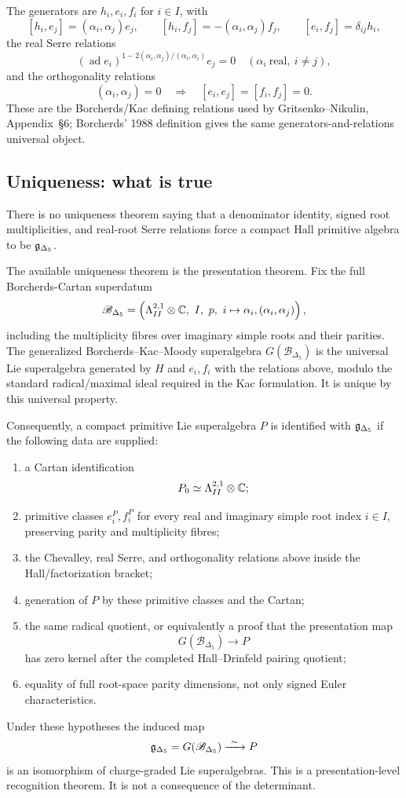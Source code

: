 The generators are \(h_i,e_i,f_i\) for \(i\in I\), with
\[
[h_i,e_j]=(\alpha_i,\alpha_j)e_j,\qquad
[h_i,f_j]=-(\alpha_i,\alpha_j)f_j,\qquad
[e_i,f_j]=\delta_{ij}h_i,
\]
the real Serre relations
\[
(\operatorname{ad}e_i)^{1-2(\alpha_i,\alpha_j)/(\alpha_i,\alpha_i)}e_j=0
\quad(\alpha_i\ \mathrm{real},\ i\ne j),
\]
and the orthogonality relations
\[
(\alpha_i,\alpha_j)=0
\quad\Longrightarrow\quad
[e_i,e_j]=[f_i,f_j]=0.
\]
These are the Borcherds/Kac defining relations used by
Gritsenko--Nikulin, Appendix~\S6; Borcherds' 1988 definition gives the
same generators-and-relations universal object.

\subsection{Uniqueness: what is true}

There is no uniqueness theorem saying that a denominator identity, signed
root multiplicities, and real-root Serre relations force a compact Hall
primitive algebra to be \(\mathfrak g_{\Delta_5}\).

The available uniqueness theorem is the presentation theorem.  Fix the full
Borcherds-Cartan superdatum
\[
\mathscr B_{\Delta_5}
=
\left(
\Lambda^{2,1}_{II}\otimes\mathbb C,\ I,\ p,\ i\mapsto\alpha_i,
(\alpha_i,\alpha_j)
\right),
\]
including the multiplicity fibres over imaginary simple roots and their
parities.  The generalized Borcherds--Kac--Moody superalgebra
\(G(\mathscr B_{\Delta_5})\) is the universal Lie superalgebra generated
by \(H\) and \(e_i,f_i\) with the relations above, modulo the standard
radical/maximal ideal required in the Kac formulation.  It is unique by
this universal property.

Consequently, a compact primitive Lie superalgebra \(P\) is identified with
\(\mathfrak g_{\Delta_5}\) if the following data are supplied:
\begin{enumerate}
\item a Cartan identification
\[
P_0\simeq\Lambda^{2,1}_{II}\otimes\mathbb C;
\]
\item primitive classes \(e_i^P,f_i^P\) for every real and imaginary simple
root index \(i\in I\), preserving parity and multiplicity fibres;
\item the Chevalley, real Serre, and orthogonality relations above inside
the Hall/factorization bracket;
\item generation of \(P\) by these primitive classes and the Cartan;
\item the same radical quotient, or equivalently a proof that the
presentation map
\[
G(\mathscr B_{\Delta_5})\longrightarrow P
\]
has zero kernel after the completed Hall--Drinfeld pairing quotient;
\item equality of full root-space parity dimensions, not only signed
Euler characteristics.
\end{enumerate}
Under these hypotheses the induced map
\[
\mathfrak g_{\Delta_5}=G(\mathscr B_{\Delta_5})
\xrightarrow{\ \sim\ }
P
\]
is an isomorphism of charge-graded Lie superalgebras.  This is a
presentation-level recognition theorem.  It is not a consequence of the
determinant.

